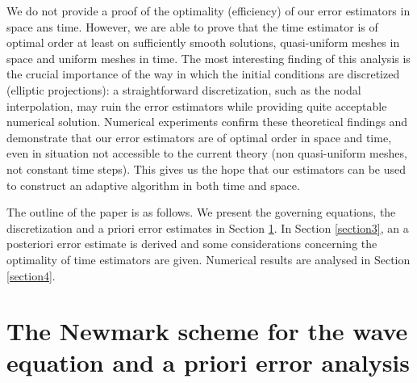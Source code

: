 \documentclass{imanum}
\begin{document}
We do not provide a proof of the optimality (efficiency) of our error estimators in space ans time. However, we are able to prove that the time estimator is of optimal order  at least on sufficiently smooth solutions, quasi-uniform meshes in space and uniform meshes in time. The most interesting finding of this analysis is the crucial importance of the way in which the initial conditions are discretized (elliptic projections): a straightforward discretization, such as the nodal interpolation, may ruin the error estimators while providing quite acceptable numerical solution.
Numerical experiments confirm these theoretical findings and demonstrate that our error estimators are of optimal order in space and time, even in situation not accessible to the current theory (non quasi-uniform meshes, not constant time steps). This gives us the hope that our estimators can be used to construct an adaptive algorithm in both time and space. 

The outline of the paper is as follows.  We present the governing equations, the discretization  and a priori error estimates in Section \ref{section2}. In Section \ref{section3}, an a posteriori error estimate is derived and some considerations concerning the optimality of time estimators are given. Numerical results are analysed in Section \ref{section4}.


\section{The Newmark scheme for the wave equation and a priori error analysis}\label{section2}
\end{document}
